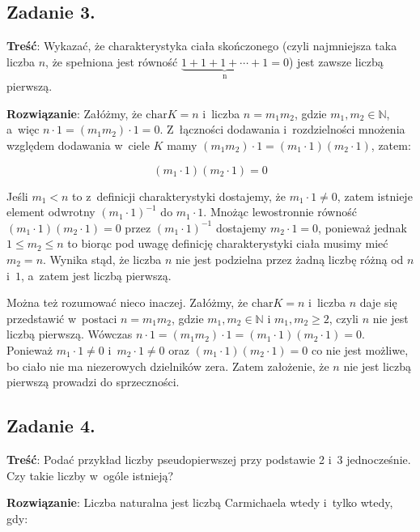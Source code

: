 \documentclass[a4paper,10pt, twocolumn]{article}
\begin{document}
\subsection{Zadanie 3.}

\textbf{Treść}: Wykazać, że charakterystyka ciała skończonego (czyli najmniejsza taka liczba $n$, że spełniona jest równość $\underbrace{1 + 1 + 1 + \cdots + 1}_\text{n} = 0$) jest zawsze liczbą pierwszą.

\textbf{Rozwiązanie}: Załóżmy, że $\text{char} K = n$ i~liczba $n = m_{1}m_{2}$, gdzie $m_{1}, m_{2} \in \mathbb{N}$, a~więc $n \cdot 1 = (m_{1}m_{2}) \cdot 1 = 0$. Z~łączności dodawania i~rozdzielności mnożenia względem dodawania w~ciele $K$ mamy $(m_{1}m_{2}) \cdot 1 = (m_{1} \cdot 1)(m_{2} \cdot 1)$, zatem:

\begin{equation*}
(m_{1} \cdot 1)(m_{2} \cdot 1) = 0
\end{equation*}

Jeśli $m_{1} < n$ to z~definicji charakterystyki dostajemy, że $m_{1} \cdot 1 \neq 0$, zatem istnieje element odwrotny $(m_{1} \cdot 1)^{-1}$ do $m_{1} \cdot 1$. Mnożąc lewostronnie równość $(m_{1} \cdot 1)(m_{2} \cdot 1) = 0$ przez $(m_{1} \cdot 1)^{-1}$ dostajemy $m_{2} \cdot 1 = 0$, ponieważ jednak $1 \leq m_{2} \leq n$ to biorąc pod uwagę definicję charakterystyki ciała musimy mieć $m_{2} = n$. Wynika stąd, że liczba $n$ nie jest podzielna przez żadną liczbę różną od $n$ i~$1$, a~zatem jest liczbą pierwszą.

Można też rozumować nieco inaczej. Załóżmy, że $\text{char} K = n$ i~liczba $n$ daje się przedstawić w~postaci $n = m_{1}m_{2}$, gdzie $m_{1}, m_{2} \in \mathbb{N}$ i $m_{1}, m_{2} \geq 2$, czyli $n$ nie jest liczbą pierwszą. Wówczas $n \cdot 1 = (m_{1}m_{2}) \cdot 1 = (m_{1} \cdot 1)(m_{2} \cdot 1) = 0$. Ponieważ $m_{1} \cdot 1 \neq 0$ i~$m_{2} \cdot 1 \neq 0$ oraz $(m_{1} \cdot 1)(m_{2} \cdot 1) = 0$ co nie jest możliwe, bo ciało nie ma niezerowych dzielników zera. Zatem założenie, że $n$ nie jest liczbą pierwszą prowadzi do sprzeczności.

\subsection{Zadanie 4.}

\textbf{Treść}: Podać przykład liczby pseudopierwszej przy podstawie 2 i~3 jednocześnie. Czy takie liczby w~ogóle istnieją?

\textbf{Rozwiązanie}: Liczba naturalna jest liczbą Carmichaela wtedy i~tylko wtedy, gdy:
\end{document}
